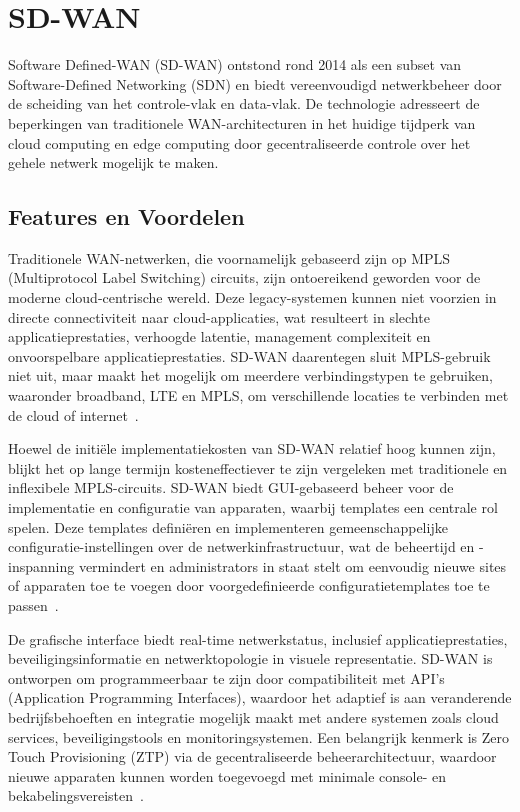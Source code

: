 \section{SD-WAN}
Software Defined-WAN (SD-WAN) ontstond rond 2014 als een subset van Software-Defined Networking (SDN) en biedt vereenvoudigd netwerkbeheer door de scheiding van het controle-vlak en data-vlak. De technologie adresseert de beperkingen van traditionele WAN-architecturen in het huidige tijdperk van cloud computing en edge computing door gecentraliseerde controle over het gehele netwerk mogelijk te maken.

\subsection{Features en Voordelen}
Traditionele WAN-netwerken, die voornamelijk gebaseerd zijn op MPLS (Multiprotocol Label Switching) circuits, zijn ontoereikend geworden voor de moderne cloud-centrische wereld. Deze legacy-systemen kunnen niet voorzien in directe connectiviteit naar cloud-applicaties, wat resulteert in slechte applicatieprestaties, verhoogde latentie, management complexiteit en onvoorspelbare applicatieprestaties. SD-WAN daarentegen sluit MPLS-gebruik niet uit, maar maakt het mogelijk om meerdere verbindingstypen te gebruiken, waaronder broadband, LTE en MPLS, om verschillende locaties te verbinden met de cloud of internet~\autocite{ijraset2025}.

\vspace{2ex}

Hoewel de initiële implementatiekosten van SD-WAN relatief hoog kunnen zijn, blijkt het op lange termijn kosteneffectiever te zijn vergeleken met traditionele en inflexibele MPLS-circuits. SD-WAN biedt GUI-gebaseerd beheer voor de implementatie en configuratie van apparaten, waarbij templates een centrale rol spelen. Deze templates definiëren en implementeren gemeenschappelijke configuratie-instellingen over de netwerkinfrastructuur, wat de beheertijd en -inspanning vermindert en administrators in staat stelt om eenvoudig nieuwe sites of apparaten toe te voegen door voorgedefinieerde configuratietemplates toe te passen~\autocite{ijraset2025}.

\vspace{2ex}

De grafische interface biedt real-time netwerkstatus, inclusief applicatieprestaties, beveiligingsinformatie en netwerktopologie in visuele representatie. SD-WAN is ontworpen om programmeerbaar te zijn door compatibiliteit met API's (Application Programming Interfaces), waardoor het adaptief is aan veranderende bedrijfsbehoeften en integratie mogelijk maakt met andere systemen zoals cloud services, beveiligingstools en monitoringsystemen. Een belangrijk kenmerk is Zero Touch Provisioning (ZTP) via de gecentraliseerde beheerarchitectuur, waardoor nieuwe apparaten kunnen worden toegevoegd met minimale console- en bekabelingsvereisten~\autocite{ijraset2025}.

